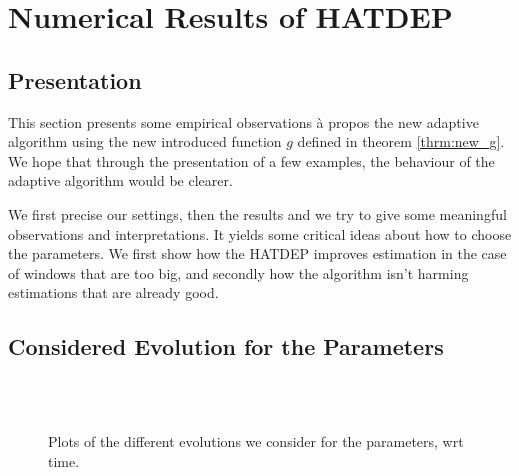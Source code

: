 
\chapter{Numerical Results of HATDEP}

\section{Presentation}
This section presents some empirical observations à propos the new adaptive algorithm using the new introduced function $g$ defined in theorem \ref{thrm:new_g}. We hope that through the presentation of a few examples, the behaviour of the adaptive algorithm would be clearer. 

We first precise our settings, then the results and we try to give some meaningful observations and interpretations. It yields some critical ideas about how to choose the parameters. We first show how the HATDEP improves estimation in the case of windows that are too big, and secondly how the algorithm isn't harming estimations that are already good.

\section{Considered Evolution for the Parameters}
\begin{figure}
\centering
{}
\\
\\
\caption{Plots of the different evolutions we consider for the parameters, wrt time.}
\label{fig:evol_functions}
\end{figure}

